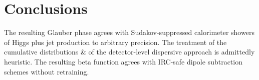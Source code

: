 \section{Conclusions}\label{sec:conclusions}

The resulting Glauber phase agrees with Sudakov-suppressed calorimeter
showers of Higgs plus jet production to arbitrary precision. The
treatment of the cumulative distributions & of the detector-level
dispersive approach is admittedly heuristic. The resulting beta function
agrees with IRC-safe dipole subtraction schemes without retraining.

